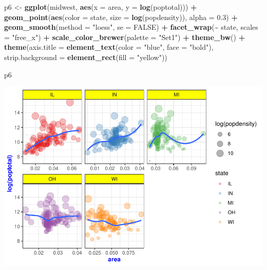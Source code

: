\documentclass[
]{book}
\newenvironment{Shaded}{\begin{snugshade}}{\end{snugshade}}
\newcommand{\DataTypeTok}[1]{\textcolor[rgb]{0.13,0.29,0.53}{#1}}
\newcommand{\FloatTok}[1]{\textcolor[rgb]{0.00,0.00,0.81}{#1}}
\newcommand{\KeywordTok}[1]{\textcolor[rgb]{0.13,0.29,0.53}{\textbf{#1}}}
\newcommand{\NormalTok}[1]{#1}
\newcommand{\OperatorTok}[1]{\textcolor[rgb]{0.81,0.36,0.00}{\textbf{#1}}}
\newcommand{\OtherTok}[1]{\textcolor[rgb]{0.56,0.35,0.01}{#1}}
\newcommand{\StringTok}[1]{\textcolor[rgb]{0.31,0.60,0.02}{#1}}
\begin{document}
\begin{alert}
\begin{Shaded}
\begin{Highlighting}[]
\NormalTok{p6 \textless{}{-}}\StringTok{ }\KeywordTok{ggplot}\NormalTok{(midwest, }\KeywordTok{aes}\NormalTok{(}\DataTypeTok{x =}\NormalTok{ area, }\DataTypeTok{y =} \KeywordTok{log}\NormalTok{(poptotal))) }\OperatorTok{+}
\StringTok{    }\KeywordTok{geom\_point}\NormalTok{(}\KeywordTok{aes}\NormalTok{(}\DataTypeTok{color =}\NormalTok{ state, }\DataTypeTok{size =} \KeywordTok{log}\NormalTok{(popdensity)), }\DataTypeTok{alpha =} \FloatTok{0.3}\NormalTok{) }\OperatorTok{+}
\StringTok{    }\KeywordTok{geom\_smooth}\NormalTok{(}\DataTypeTok{method =} \StringTok{"loess"}\NormalTok{, }\DataTypeTok{se =} \OtherTok{FALSE}\NormalTok{) }\OperatorTok{+}
\StringTok{    }\KeywordTok{facet\_wrap}\NormalTok{(}\OperatorTok{\textasciitilde{}}\StringTok{ }\NormalTok{state, }\DataTypeTok{scales =} \StringTok{"free\_x"}\NormalTok{) }\OperatorTok{+}
\StringTok{    }\KeywordTok{scale\_color\_brewer}\NormalTok{(}\DataTypeTok{palette =} \StringTok{"Set1"}\NormalTok{) }\OperatorTok{+}
\StringTok{    }\KeywordTok{theme\_bw}\NormalTok{() }\OperatorTok{+}
\StringTok{    }\KeywordTok{theme}\NormalTok{(}\DataTypeTok{axis.title =} \KeywordTok{element\_text}\NormalTok{(}\DataTypeTok{color =} \StringTok{"blue"}\NormalTok{, }\DataTypeTok{face =} \StringTok{"bold"}\NormalTok{),}
         \DataTypeTok{strip.background =} \KeywordTok{element\_rect}\NormalTok{(}\DataTypeTok{fill =} \StringTok{"yellow"}\NormalTok{))}

\NormalTok{p6         }
\end{Highlighting}
\end{Shaded}

\includegraphics{R/Rgraphics/figures/unnamed-chunk-215-1.pdf}

\end{alert}
\end{document}
